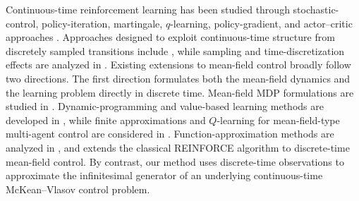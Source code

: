 \documentclass[a4paper, 10pt, english, reqno]{amsart}
\begin{document}
Continuous-time reinforcement learning has been studied through stochastic-control, policy-iteration, martingale, $q$-learning, policy-gradient, and actor--critic approaches \cite{doya2000,Munos2006PolicyGradient,VamvoudakisLewis2010,LeeSutton2021,wang2020,jia2022,jia2023,jia_qlearning2023,ZHAOPolicyOptimization}. Approaches designed to exploit continuous-time structure from discretely sampled transitions include \cite{KimShinYang2021,SettaiTakeishiYairi2025}, while sampling and time-discretization effects are analyzed in \cite{tallec2019,JiaOuyangZhang2025,reconciling2026,PhamZhangZhu2026}. Existing extensions to mean-field control broadly follow two directions. The first direction formulates both the mean-field dynamics and the learning problem directly in discrete time. Mean-field MDP formulations are studied in \cite{motte2022mean,bauerle2023mean}. Dynamic-programming and value-based learning methods are developed in \cite{angiuli2022unified,carmona2023model,gu2021,gu2023}, while finite approximations and $Q$-learning for mean-field-type multi-agent control are considered in \cite{BayraktarKaraBauerle}. Function-approximation methods are analyzed in \cite{BayraktarKaraJMLR}, and \cite{meunierpham2026} extends the classical REINFORCE algorithm to discrete-time mean-field control. By contrast, our method uses discrete-time observations to approximate the infinitesimal generator of an underlying continuous-time McKean--Vlasov control problem. 
\end{document}
